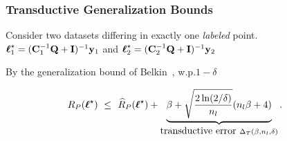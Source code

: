\documentclass{beamer}
\begin{document}
\begin{frame}
\frametitle{Transductive Generalization Bounds}
Consider two datasets differing in exactly one \textit{labeled} point.
\pause
$\boldsymbol \ell_1^\star = (\mathbf{C}_1^{-1}\mathbf{Q} + \mathbf{I})^{-1}\mathbf{y}_1$
and 
$\boldsymbol \ell_2^\star = (\mathbf{C}_2^{-1}\mathbf{Q} + \mathbf{I})^{-1}\mathbf{y}_2$\\

\bskip
\pause
{}
\pause

\bskip
By the generalization bound of Belkin~\cite{belkin2004regularization}, w.p.$1 - \delta$
\begin{align*}
  R_P(\boldsymbol \ell^\star) \ \leq & \ \
  \widehat{R}_P(\boldsymbol \ell^\star) +
  \underbrace{\beta + \sqrt{\frac{2 \ln(2 / \delta)}{n_l}}
  (n_l \beta + 4)}_{\mbox{transductive error }
  \Delta_T(\beta, n_l, \delta)}.
\end{align*}

\end{frame}
\end{document}
